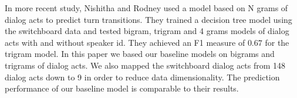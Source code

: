 In more recent study, Nishitha and Rodney \cite{SSS1510313} used a model based on N grams of dialog acts to predict turn transitions.
They trained a decision tree model using the switchboard data and tested bigram, trigram and 4 grams models of
dialog acts with and without speaker id. They achieved an F1 measure of $0.67$ for the trigram model.
In this paper we based our baseline models on bigrams and trigrams of dialog acts.  We also mapped the switchboard dialog acts from 148 dialog acts down to 9 in order to reduce data dimensionality. The prediction performance of our baseline model is comparable to their results.

